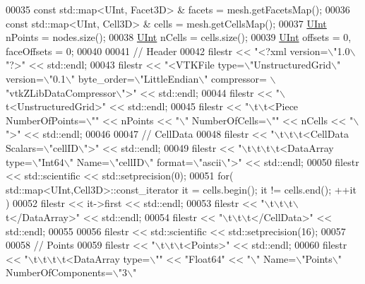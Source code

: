 \begin{DoxyCode}
00035     \textcolor{keyword}{const} std::map<UInt, Facet3D> & facets = mesh.getFacetsMap();
00036     \textcolor{keyword}{const} std::map<UInt, Cell3D> & cells = mesh.getCellsMap();
00037     \hyperlink{namespaceFVCode3D_a4bf7e328c75d0fd504050d040ebe9eda}{UInt} nPoints = nodes.size();
00038     \hyperlink{namespaceFVCode3D_a4bf7e328c75d0fd504050d040ebe9eda}{UInt} nCells = cells.size();
00039     \hyperlink{namespaceFVCode3D_a4bf7e328c75d0fd504050d040ebe9eda}{UInt} offsets = 0, faceOffsets = 0;
00040 
00041     \textcolor{comment}{// Header}
00042     filestr << \textcolor{stringliteral}{"<?xml version=\(\backslash\)"1.0\(\backslash\)"?>"} << std::endl;
00043     filestr << \textcolor{stringliteral}{"<VTKFile type=\(\backslash\)"UnstructuredGrid\(\backslash\)" version=\(\backslash\)"0.1\(\backslash\)" byte\_order=\(\backslash\)"LittleEndian\(\backslash\)" compressor=
      \(\backslash\)"vtkZLibDataCompressor\(\backslash\)">"} << std::endl;
00044     filestr << \textcolor{stringliteral}{"\(\backslash\)t<UnstructuredGrid>"} << std::endl;
00045     filestr << \textcolor{stringliteral}{"\(\backslash\)t\(\backslash\)t<Piece NumberOfPoints=\(\backslash\)""} << nPoints << \textcolor{stringliteral}{"\(\backslash\)" NumberOfCells=\(\backslash\)""} << nCells << \textcolor{stringliteral}{"\(\backslash\)">"} << 
      std::endl;
00046 
00047     \textcolor{comment}{// CellData}
00048     filestr << \textcolor{stringliteral}{"\(\backslash\)t\(\backslash\)t\(\backslash\)t<CellData Scalars=\(\backslash\)"cellID\(\backslash\)">"} << std::endl;
00049     filestr << \textcolor{stringliteral}{"\(\backslash\)t\(\backslash\)t\(\backslash\)t\(\backslash\)t<DataArray type=\(\backslash\)"Int64\(\backslash\)" Name=\(\backslash\)"cellID\(\backslash\)" format=\(\backslash\)"ascii\(\backslash\)">"} << std::endl;
00050     filestr << std::scientific << std::setprecision(0);
00051     \textcolor{keywordflow}{for}( std::map<UInt,Cell3D>::const\_iterator it = cells.begin(); it != cells.end(); ++it )
00052         filestr << it->first << std::endl;
00053     filestr << \textcolor{stringliteral}{"\(\backslash\)t\(\backslash\)t\(\backslash\)t\(\backslash\)t</DataArray>"} << std::endl;
00054     filestr << \textcolor{stringliteral}{"\(\backslash\)t\(\backslash\)t\(\backslash\)t</CellData>"} << std::endl;
00055 
00056     filestr << std::scientific << std::setprecision(16);
00057 
00058     \textcolor{comment}{// Points}
00059     filestr << \textcolor{stringliteral}{"\(\backslash\)t\(\backslash\)t\(\backslash\)t<Points>"} << std::endl;
00060     filestr << \textcolor{stringliteral}{"\(\backslash\)t\(\backslash\)t\(\backslash\)t\(\backslash\)t<DataArray type=\(\backslash\)""} << \textcolor{stringliteral}{"Float64"} << \textcolor{stringliteral}{"\(\backslash\)" Name=\(\backslash\)"Points\(\backslash\)" NumberOfComponents=\(\backslash\)"3\(\backslash\)"
}
\end{DoxyCode}
